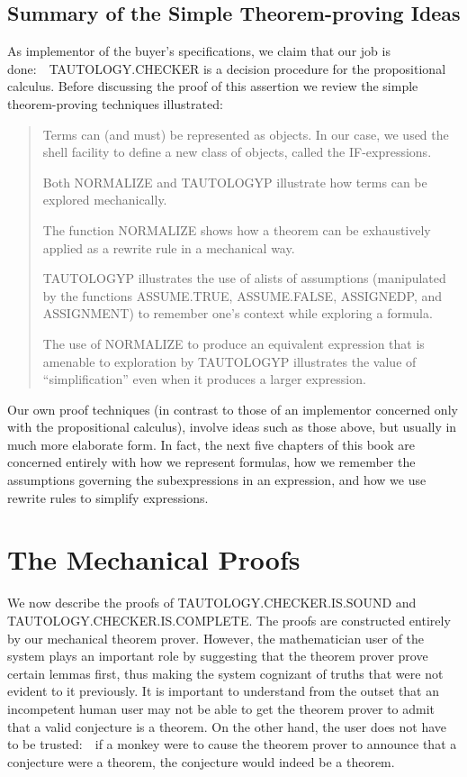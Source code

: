 \documentclass[11pt]{book}
\newenvironment{pubcrown}{\begin{quote}}{\end{quote}}
\newcommand{\pubdefaulttextsize}{\large}
\begin{document}
\subsection{Summary of the Simple Theorem-proving Ideas}
\pubdefaulttextsize
As implementor of the buyer's specifications, we claim that our
job is done:~~TAU\-TOL\-OGY.CHECK\-ER is a decision procedure
for the propositional calculus.  Before discussing the proof of this assertion we review the
simple theorem-proving techniques illustrated:
\begin{pubcrown}
Terms can (and must) be represented as objects.  In our case, we
used the shell facility to define a new class of objects, called
the IF-expressions.

Both NORMALIZE and TAUTOLOGYP illustrate how terms can be explored
mechanically.

The function NORMALIZE shows how a theorem can be exhaustively
applied as a rewrite rule in a mechanical way.

TAUTOLOGYP illustrates the use of alists of assumptions (manipulated
by the functions AS\-SUME.TRUE, AS\-SUME.FALSE, ASSIGNEDP, and ASSIGN\-MENT)
to remember one's context while exploring a formula.

The use of NORMALIZE to produce an equivalent
expression that is amenable to exploration by TAUTOLOGYP illustrates the
value of ``simplification'' even when it produces a larger expression.
\end{pubcrown}

Our own proof techniques (in contrast to those of an implementor
concerned only with the propositional calculus),  involve ideas such as those
above, but usually in much more elaborate
form.  In fact, the next five chapters of this book
are concerned entirely with how we represent formulas, how we remember the assumptions governing
the subexpressions in an expression, and how we use rewrite
rules to simplify expressions.
\section{The Mechanical Proofs}
\pubdefaulttextsize
We now describe the proofs of TAU\-TOL\-OGY.CHECK\-ER.IS.SOUND
and TAU\-TOL\-OGY.CHECK\-ER.IS.COMPLETE.  The proofs are constructed entirely by our
mechanical theorem prover.  However, the mathematician user of the system
plays an important role by suggesting that the theorem prover prove
certain lemmas first, thus making the system cognizant of truths that were not
evident to it previously.  It is important to understand from the outset
that an incompetent human user may not be able to get the theorem prover
to admit that a valid conjecture is a theorem.  On the other hand, the
user does not have to be trusted:~~if a monkey were to cause the theorem prover
to announce that a conjecture were a theorem, the conjecture would indeed
be a theorem.
\end{document}
